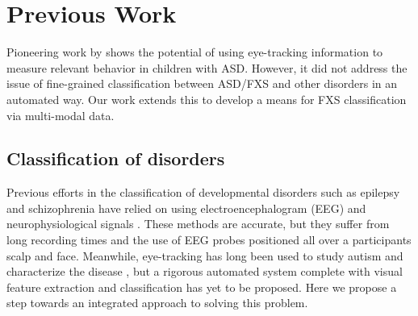 \documentclass[10pt,twocolumn,letterpaper]{article}
\begin{document}
\vspace{-0.1cm}
\section {Previous Work}
\vspace{-0.1cm}
Pioneering work by \cite{Rehg} shows the potential of using eye-tracking information to measure relevant behavior in children with ASD. However, it did not address the issue of fine-grained classification between ASD/FXS and other disorders in an automated way. Our work extends this to develop a means for FXS classification via multi-modal data.
\vspace{-0.1cm}
\subsection{Classification of disorders} Previous efforts in the classification of developmental disorders such as epilepsy and schizophrenia have relied on using electroencephalogram (EEG) and neurophysiological signals \cite{Kumar, sabeti}. These methods are accurate, but they suffer from long recording times and the use of EEG probes positioned all over a participants scalp and face. Meanwhile, eye-tracking has long been used to study autism and characterize the disease \cite{Boraston, hashemi, dalton}, but a rigorous automated system complete with visual feature extraction and classification has yet to be proposed. Here we propose a step towards an integrated approach to solving this problem. 
\vspace{-0.1cm}
\end{document}
